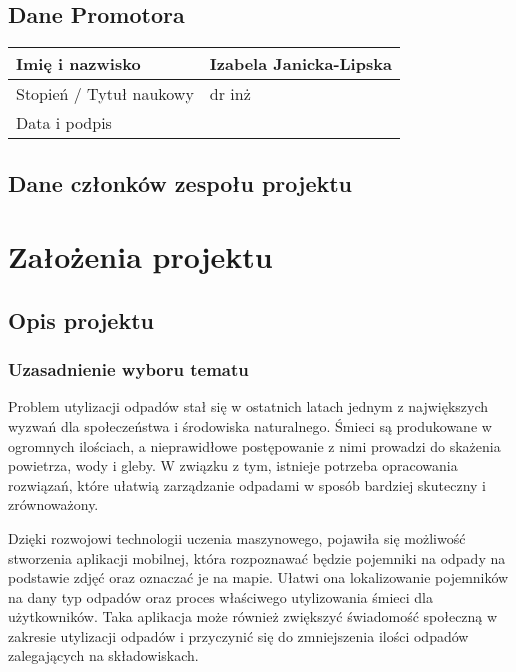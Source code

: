 \documentclass[12pt,twoside]{book}
\begin{document}
\section{Dane Promotora}

\begin{tabular}{ |p{5cm}|p{9cm}|}
    \hline
    Imię i nazwisko & Izabela Janicka-Lipska \\
    \hline
    Stopień / Tytuł naukowy & dr inż \\
    \hline
    Data i podpis &  \\ \hline
\end{tabular}


\pagestyle{plain}

\section{Dane członków zespołu projektu}

\membersTable

{\let\clearpage\relax
    \chapter{Założenia projektu}
    }

\section{Opis projektu}

\subsection{Uzasadnienie wyboru tematu}

Problem utylizacji odpadów stał się w ostatnich latach jednym z największych wyzwań dla społeczeństwa i środowiska naturalnego. Śmieci są produkowane w ogromnych ilościach, a nieprawidłowe postępowanie z nimi prowadzi do skażenia powietrza, wody i gleby. W związku z tym, istnieje potrzeba opracowania rozwiązań, które ułatwią zarządzanie odpadami w sposób bardziej skuteczny i zrównoważony.

Dzięki rozwojowi technologii uczenia maszynowego, pojawiła się możliwość stworzenia aplikacji mobilnej, która rozpoznawać będzie pojemniki na odpady na podstawie zdjęć oraz oznaczać je na mapie. Ułatwi ona lokalizowanie pojemników na dany typ odpadów oraz proces właściwego utylizowania śmieci dla użytkowników. Taka aplikacja może również zwiększyć świadomość społeczną w zakresie utylizacji odpadów i przyczynić się do zmniejszenia ilości odpadów zalegających na składowiskach.
\end{document}

